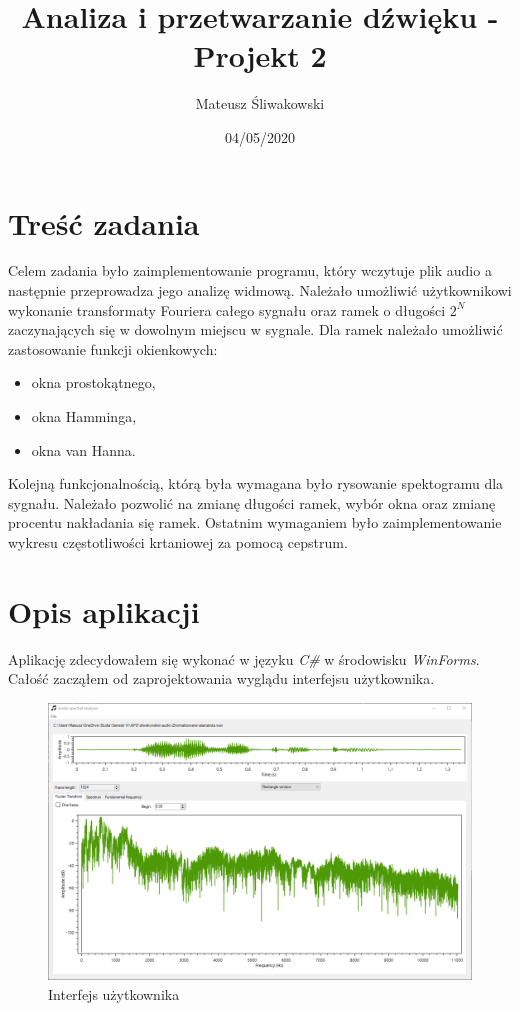 \documentclass{article}
\title{Analiza i przetwarzanie dźwięku - Projekt 2}
\date{04/05/2020}
\author{Mateusz Śliwakowski}
\begin{document}
  \maketitle
  
\section{Treść zadania}
Celem zadania było zaimplementowanie programu, który wczytuje plik audio a następnie przeprowadza jego analizę widmową. Należało umożliwić użytkownikowi wykonanie transformaty Fouriera całego sygnału oraz ramek o długości $2^N$ zaczynających się w dowolnym miejscu w sygnale. Dla ramek należało umożliwić zastosowanie funkcji okienkowych:
\begin{itemize}
\item okna prostokątnego,
\item okna Hamminga,
\item okna van Hanna.
\end{itemize}
Kolejną funkcjonalnością, którą była wymagana było rysowanie spektogramu dla sygnału. Należało pozwolić na zmianę długości ramek, wybór okna oraz zmianę procentu nakładania się ramek. Ostatnim wymaganiem było zaimplementowanie wykresu częstotliwości krtaniowej za pomocą cepstrum.

\section{Opis aplikacji}

Aplikację zdecydowałem się wykonać w języku \textit{C\#} w środowisku \textit{WinForms}. Całość zacząłem od zaprojektowania wyglądu interfejsu użytkownika.

\begin{figure}[H]
\includegraphics[width=6in]{scr1.png}
\centering
\caption{Interfejs użytkownika}
\label{fig:interface}
\end{figure}
\end{document}
